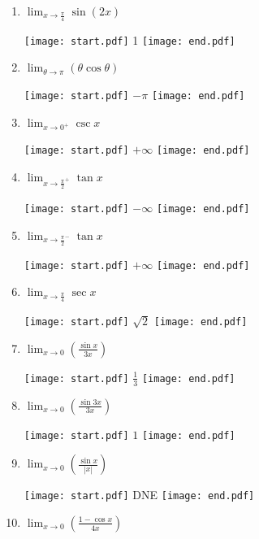 \documentclass[12pt]{article}
\begin{document}
\begin{enumerate}

\item  $\displaystyle \lim_{x\rightarrow \frac{\pi}{4}} \sin{(2x)}$ 

\texttt{[image: start.pdf]}
{{1}}
\texttt{[image: end.pdf]}


\item $\displaystyle \lim_{\theta \rightarrow \pi}{(\theta \cos{\theta})}$

\texttt{[image: start.pdf]}
{{$-\pi$}}
\texttt{[image: end.pdf]}


\item  $\displaystyle \lim_{x\rightarrow 0^+} \csc x$ 

\texttt{[image: start.pdf]}
{{$+\infty$}}
\texttt{[image: end.pdf]}


\item  $\displaystyle \lim_{x\rightarrow \frac{\pi}{2}^+} \tan x$ 

\texttt{[image: start.pdf]}
{{$-\infty$}}
\texttt{[image: end.pdf]}


\item  $\displaystyle \lim_{x\rightarrow \frac{\pi}{2}^-} \tan x$ 

\texttt{[image: start.pdf]}
{{$+\infty$}}
\texttt{[image: end.pdf]}


\item $\displaystyle \lim_{x \rightarrow \frac{\pi}{4}}{\sec{x}}$

\texttt{[image: start.pdf]}
{{$\sqrt{2}$}}
\texttt{[image: end.pdf]}


\item $\displaystyle \lim_{x\rightarrow 0}{\left(\frac{\sin{x}}{3x}\right)}$ 

\texttt{[image: start.pdf]}
{{$\displaystyle \frac{1}{3}$}}
\texttt{[image: end.pdf]}


\item $\displaystyle \lim_{x\rightarrow 0}{\left(\frac{\sin{3x}}{3x}\right)}$ 

\texttt{[image: start.pdf]}
{{$\displaystyle 1$}}
\texttt{[image: end.pdf]}


\item $\displaystyle \lim_{x\rightarrow 0}{\left(\frac{\sin{x}}{|x|}\right)}$

\texttt{[image: start.pdf]}
{{DNE}}
\texttt{[image: end.pdf]}


\item $\displaystyle \lim_{x\rightarrow 0}{\left(\frac{1-\cos{x}}{4x}\right)}$


\end{enumerate}
\end{document}
